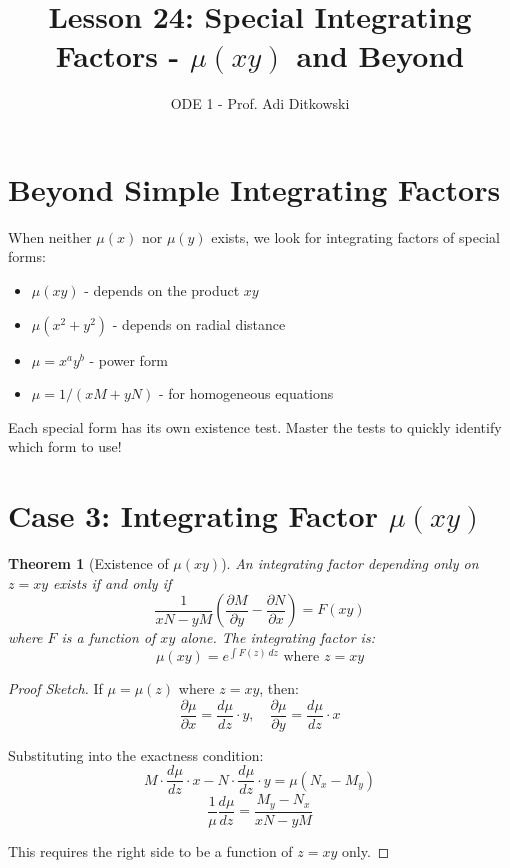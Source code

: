 \documentclass[12pt]{article}
\title{Lesson 24: Special Integrating Factors - $\mu(xy)$ and Beyond}
\author{ODE 1 - Prof. Adi Ditkowski}
\date{}
\newtheorem{theorem}{Theorem}
\begin{document}
\maketitle

\section{Beyond Simple Integrating Factors}

When neither $\mu(x)$ nor $\mu(y)$ exists, we look for integrating factors of special forms:
\begin{itemize}
    \item $\mu(xy)$ - depends on the product $xy$
    \item $\mu(x^2 + y^2)$ - depends on radial distance
    \item $\mu = x^a y^b$ - power form
    \item $\mu = 1/(xM + yN)$ - for homogeneous equations
\end{itemize}

\begin{keypoint}
Each special form has its own existence test. Master the tests to quickly identify which form to use!
\end{keypoint}

\section{Case 3: Integrating Factor $\mu(xy)$}

\begin{theorem}[Existence of $\mu(xy)$]
An integrating factor depending only on $z = xy$ exists if and only if
\[\frac{1}{xN - yM}\left(\frac{\partial M}{\partial y} - \frac{\partial N}{\partial x}\right) = F(xy)\]
where $F$ is a function of $xy$ alone. The integrating factor is:
\[\mu(xy) = e^{\int F(z)\,dz} \text{ where } z = xy\]
\end{theorem}

\begin{proof}[Proof Sketch]
If $\mu = \mu(z)$ where $z = xy$, then:
\[\frac{\partial \mu}{\partial x} = \frac{d\mu}{dz} \cdot y, \quad \frac{\partial \mu}{\partial y} = \frac{d\mu}{dz} \cdot x\]

Substituting into the exactness condition:
\[M \cdot \frac{d\mu}{dz} \cdot x - N \cdot \frac{d\mu}{dz} \cdot y = \mu(N_x - M_y)\]
\[\frac{1}{\mu}\frac{d\mu}{dz} = \frac{M_y - N_x}{xN - yM}\]

This requires the right side to be a function of $z = xy$ only.
\end{proof}
\end{document}
